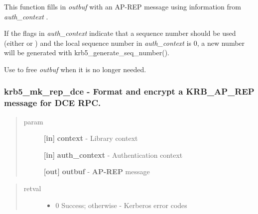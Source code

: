 \documentclass[letterpaper,10pt,english]{sphinxmanual}
\begin{document}
This function fills in \emph{outbuf} with an AP-REP message using information from \emph{auth\_context} .

If the flags in \emph{auth\_context} indicate that a sequence number should be used (either {\hyperref[appdev/refs/macros/KRB5_AUTH_CONTEXT_DO_SEQUENCE:KRB5_AUTH_CONTEXT_DO_SEQUENCE]{}} or {\hyperref[appdev/refs/macros/KRB5_AUTH_CONTEXT_RET_SEQUENCE:KRB5_AUTH_CONTEXT_RET_SEQUENCE]{}} ) and the local sequence number in \emph{auth\_context} is 0, a new number will be generated with krb5\_generate\_seq\_number().

Use {\hyperref[appdev/refs/api/krb5_free_data_contents:c.krb5_free_data_contents]{}} to free \emph{outbuf} when it is no longer needed.


\subsubsection{krb5\_mk\_rep\_dce -  Format and encrypt a KRB\_AP\_REP message for DCE RPC.}
\label{appdev/refs/api/krb5_mk_rep_dce:krb5-mk-rep-dce-format-and-encrypt-a-krb-ap-rep-message-for-dce-rpc}\label{appdev/refs/api/krb5_mk_rep_dce::doc}

\begin{fulllineitems}
\label{appdev/refs/api/krb5_mk_rep_dce:c.krb5_mk_rep_dce}
\end{fulllineitems}

\begin{quote}\begin{description}
\item[{param}] \leavevmode
\textbf{{[}in{]}} \textbf{context} - Library context

\textbf{{[}in{]}} \textbf{auth\_context} - Authentication context

\textbf{{[}out{]}} \textbf{outbuf} - \textbf{AP-REP} message

\end{description}\end{quote}
\begin{quote}\begin{description}
\item[{retval}] \leavevmode\begin{itemize}
\item {} 
0   Success; otherwise - Kerberos error codes

\end{itemize}

\end{description}\end{quote}
\end{document}
